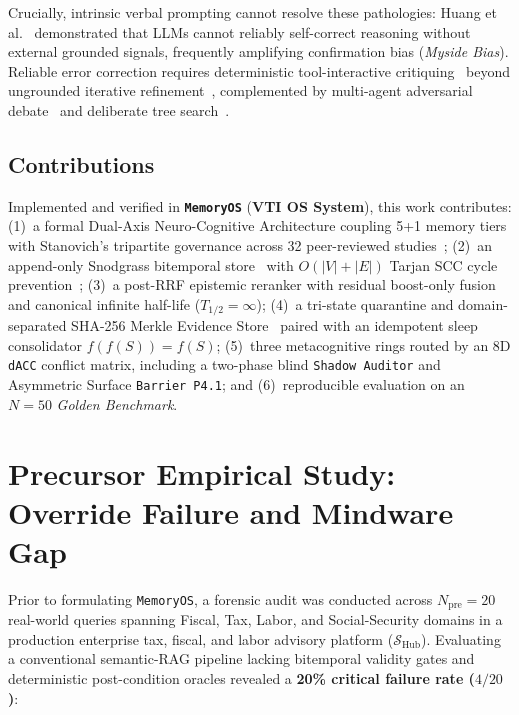 \documentclass[10pt,twocolumn]{article}
\begin{document}
Crucially, intrinsic verbal prompting cannot resolve these pathologies: Huang et al.~\cite{E28} demonstrated that LLMs cannot reliably self-correct reasoning without external grounded signals, frequently amplifying confirmation bias (\emph{Myside Bias}). Reliable error correction requires deterministic tool-interactive critiquing~\cite{E29} beyond ungrounded iterative refinement~\cite{E30}, complemented by multi-agent adversarial debate~\cite{E31} and deliberate tree search~\cite{E32}.

\subsection{Contributions}
Implemented and verified in \textbf{\texttt{MemoryOS}} (\textbf{VTI OS System}), this work contributes: (1)~a formal Dual-Axis Neuro-Cognitive Architecture coupling 5+1 memory tiers with Stanovich's tripartite governance across 32 peer-reviewed studies~\cite{E01,E21}; (2)~an append-only Snodgrass bitemporal store~\cite{E12} with $O(|V|+|E|)$ Tarjan SCC cycle prevention~\cite{E13}; (3)~a post-RRF epistemic reranker with residual boost-only fusion and canonical infinite half-life ($T_{1/2}=\infty$); (4)~a tri-state quarantine and domain-separated SHA-256 Merkle Evidence Store~\cite{E19} paired with an idempotent sleep consolidator $f(f(S))=f(S)$; (5)~three metacognitive rings routed by an 8D \texttt{dACC} conflict matrix, including a two-phase blind \texttt{Shadow Auditor} and Asymmetric Surface \texttt{Barrier P4.1}; and (6)~reproducible evaluation on an $N=50$ \emph{Golden Benchmark}.

\section{Precursor Empirical Study: Override Failure and Mindware Gap}

Prior to formulating \texttt{MemoryOS}, a forensic audit was conducted across $N_{\mathrm{pre}} = 20$ real-world queries spanning Fiscal, Tax, Labor, and Social-Security domains in a production enterprise tax, fiscal, and labor advisory platform ($\mathcal{S}_{\mathrm{Hub}}$). Evaluating a conventional semantic-RAG pipeline lacking bitemporal validity gates and deterministic post-condition oracles revealed a \textbf{20\% critical failure rate ($4/20$)}:
\end{document}
